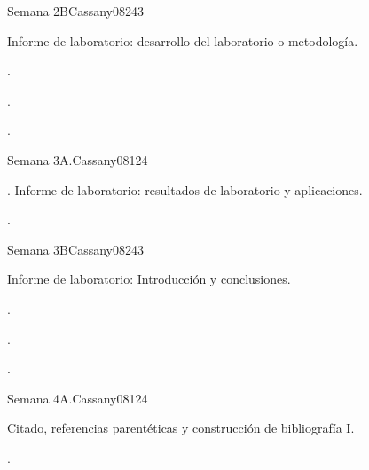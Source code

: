 \begin{syllabus}
\begin{unit}{}{Semana 2B}{Cassany08}{24}{3}
   \begin{topics}
      \item Informe de laboratorio: desarrollo del laboratorio o metodología.
   \end{topics}

   \begin{learningoutcomes}
      \item . 
      \item .
      \item . 
      \end{learningoutcomes}
\end{unit}

\begin{unit}{}{Semana 3A.}{Cassany08}{12}{4}
   \begin{topics}
      \item . Informe de laboratorio: resultados de laboratorio y aplicaciones. 
   \end{topics}
   \begin{learningoutcomes}
      \item . 
   \end{learningoutcomes}
\end{unit}

\begin{unit}{}{Semana 3B}{Cassany08}{24}{3}
   \begin{topics}
      \item Informe de laboratorio: Introducción y conclusiones. 
   \end{topics}

   \begin{learningoutcomes}
      \item . 
      \item .
      \item . 
      \end{learningoutcomes}
\end{unit}

\begin{unit}{}{Semana 4A.}{Cassany08}{12}{4}
   \begin{topics}
      \item Citado, referencias parentéticas y construcción de bibliografía I. 
   \end{topics}
   \begin{learningoutcomes}
      \item . 
   \end{learningoutcomes}
\end{unit}


\end{syllabus}
